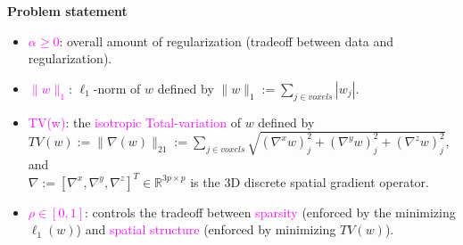 \documentclass[french]{STIC_poster}
\begin{document}
\begin{frame}[t]
\begin{columns}[t]
\begin{column}{.48\linewidth}
\begin{sxbox}[\textwidth]{\textbf{Problem statement}}
\begin{itemize}
\begin{itemize}
                                      \item \textcolor{magenta}{$\alpha \ge 0$}: overall amount of regularization (tradeoff between data and regularization).
                                        \item \textcolor{magenta}{$\|w\|_1$}: $\ell_1$-norm of $w$ defined by $\|w\|_1 := \sum_{j \in voxels}{|w_j|}$.
                                      \item \textcolor{magenta}{TV(w)}: the \textcolor{magenta}{isotropic Total-variation} of $w$ defined by\\
                                        $TV(w):=\|\nabla(w)\|_{21} :=\sum_{j \in voxels}{\sqrt{(\nabla^xw)_j^2+(\nabla^yw)_j^2+(\nabla^zw)_j^2}}$,
                                        and \\ $\nabla := [\nabla^x,\nabla^y,\nabla^z]^T \in \mathbb{R}^{3p \times p}$
                                        is the 3D discrete spatial gradient operator.
                                      \item \textcolor{magenta}{$\rho \in [0, 1]$}: controls the tradeoff between \textcolor{magenta}{sparsity}
                                        (enforced by the minimizing $\ell_1(w)$) and
                                        \textcolor{magenta}{spatial structure} (enforced by minimizing $TV(w)$).


\end{itemize}
\end{itemize}
\end{sxbox}
\end{column}
\end{columns}
\end{frame}
\end{document}
